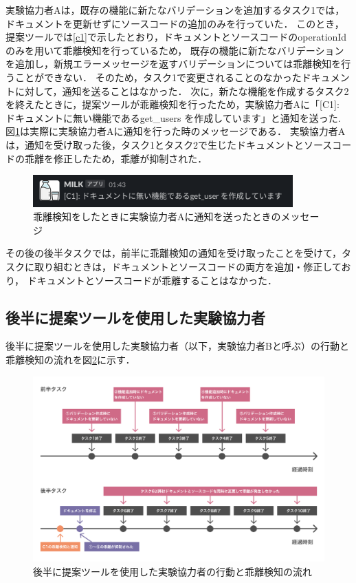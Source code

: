実験協力者Aは，既存の機能に新たなバリデーションを追加するタスク1では，ドキュメントを更新せずにソースコードの追加のみを行っていた．
このとき，提案ツールでは\ref{c1}で示したとおり，ドキュメントとソースコードのoperationIdのみを用いて乖離検知を行っているため，
既存の機能に新たなバリデーションを追加し，新規エラーメッセージを返すバリデーションについては乖離検知を行うことができない．
そのため，タスク1で変更されることのなかったドキュメントに対して，通知を送ることはなかった．
次に，新たな機能を作成するタスク2を終えたときに，提案ツールが乖離検知を行ったため，実験協力者Aに「[C1]: ドキュメントに無い機能であるget\_users を作成しています」と通知を送った.
図\ref{notification1}は実際に実験協力者Aに通知を行った時のメッセージである．
実験協力者Aは，通知を受け取った後，タスク1とタスク2で生じたドキュメントとソースコードの乖離を修正したため，乖離が抑制された．

\begin{figure}[H]
    \centering
    \includegraphics[width=10cm]{images/notification1.png}
    \caption{乖離検知をしたときに実験協力者Aに通知を送ったときのメッセージ}
    \label{notification1}
\end{figure}

その後の後半タスクでは，前半に乖離検知の通知を受け取ったことを受けて，タスクに取り組むときは，ドキュメントとソースコードの両方を追加・修正しており，
ドキュメントとソースコードが乖離することはなかった．

\subsection{後半に提案ツールを使用した実験協力者}
後半に提案ツールを使用した実験協力者（以下，実験協力者Bと呼ぶ）の行動と乖離検知の流れを図\ref{userb}に示す．
\begin{figure}[H]
    \centering
    \includegraphics[width=14cm]{images/userb.png}
    \caption{後半に提案ツールを使用した実験協力者の行動と乖離検知の流れ}
    \label{userb}
\end{figure}

